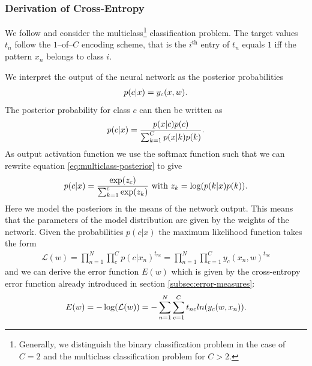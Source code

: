 \subsubsection{Derivation of Cross-Entropy}

We follow \cite[p.~232-236]{Bishop:2006} and consider the multiclass\footnote{Generally, we distinguish the binary classification problem in the case of $C = 2$ and the multiclass classification problem for $C > 2$.} classification problem. The target values $t_n$ follow the $1$--of--$C$ encoding scheme, that is the $i^\text{th}$ entry of $t_n$ equals $1$ iff the pattern $x_n$ belongs to class $i$.

We interpret the output of the neural network as the posterior probabilities
\begin{align}
p(c | x) = y_c(x,w)\onedot
\end{align}
The posterior probability for class $c$ can then be written as
\begin{align}
\label{eq:multiclass-posterior}
p(c | x) = \frac{p(x | c) p(c)}{\sum _{k = 1} ^C p(x | k) p(k)}\onedot
\end{align}
As output activation function we use the softmax function such that we can rewrite equation \eqref{eq:multiclass-posterior} to give
\begin{align}
p(c | x) = \frac{\exp({z_c})}{\sum _{k = 1} ^c \exp({z_k})} \text{ with } z_k = \log(p(k | x) p(k))\onedot
\end{align}
Here we model the posteriors in the means of the network output. This means that the parameters of the model distribution are given by the weights of the network. Given the probabilities $p(c | x)$ the maximum likelihood function takes the form
\begin{align}
\mathcal{L} (w) = \prod _{n = 1} ^N \prod _{c} ^C p(c | x_n)^{t_{nc}} =  \prod _{n = 1} ^N \prod _{c = 1} ^C y_c(x_n,w)^{t_{nc}}
\end{align}
and we can derive the error function $E(w)$ which is given by the cross-entropy error function already introduced in section \ref{subsec:error-measures}:
\begin{align}
E(w) = - \log(\mathcal{L}(w)) = - \sum _{n = 1} ^N \sum _{c = 1} ^C t_{nc} ln(y_c(w, x_n))\onedot
\end{align}

